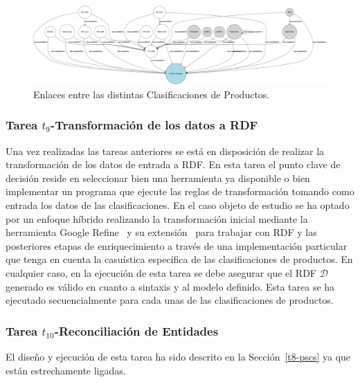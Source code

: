 \begin{figure}[!htb]
\centering
	\includegraphics[width=20cm,angle=90]{./images/phd/pscs}
\caption{Enlaces entre las distintas Clasificaciones de Productos.}
\label{fig:linked-pscs}
\end{figure}

\subsubsection{Tarea $t_9$-Transformación de los datos a RDF }
Una vez realizadas las tareas anteriores se está en disposición de realizar la transformación 
de los datos de entrada a \gls{RDF}. En esta tarea el punto clave de decisión reside en seleccionar bien 
una herramienta ya disponible o bien implementar un programa que ejecute las reglas de transformación 
tomando como entrada los datos de las clasificaciones. En el caso objeto de estudio se ha optado 
por un enfoque híbrido realizando la transformación inicial mediante la herramienta Google Refine~\cite{google-refine} y su extensión~\cite{grefine} 
para trabajar con RDF y las posteriores etapas de enriquecimiento a través de una implementación particular que tenga en cuenta 
la casuística específica de las clasificaciones de productos. En cualquier caso, en la ejecución de esta 
tarea se debe asegurar que el \dataset RDF $\mathcal{D}$ generado es válido en cuanto a sintaxis y al modelo definido. Esta tarea 
se ha ejecutado secuencialmente para cada unas de las clasificaciones de productos.
% 

\subsubsection{Tarea $t_{10}$-Reconciliación de Entidades}
El diseño y ejecución de esta tarea ha sido descrito en la Sección~\ref{t8-pscs} ya que están 
estrechamente ligadas.

